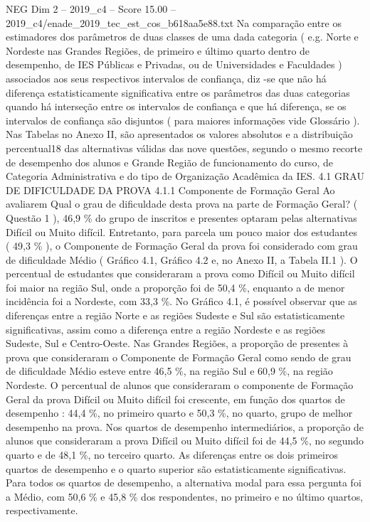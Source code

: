 \begin{textsample}{NEG Dim 2 – 2019\_c4 – Score 15.00 – 2019\_c4/enade\_2019\_tec\_est\_cos\_b618aa5e88.txt}
Na comparação entre os estimadores dos parâmetros de duas classes de uma dada categoria ( e.g.
Norte e Nordeste nas Grandes Regiões, de primeiro e último quarto dentro de desempenho, de IES Públicas e Privadas, ou de Universidades e Faculdades ) associados aos seus respectivos intervalos de confiança, diz -se que não há diferença estatisticamente significativa entre os parâmetros das duas categorias quando há interseção entre os intervalos de confiança e que há diferença, se os intervalos de confiança são disjuntos ( para maiores informações vide Glossário ).
Nas Tabelas no Anexo II, são apresentados os valores absolutos e a distribuição percentual18 das alternativas válidas das nove questões, segundo o mesmo recorte de desempenho dos alunos e Grande Região de funcionamento do curso, de Categoria Administrativa e do tipo de Organização Acadêmica da IES. 4.1 GRAU DE DIFICULDADE DA PROVA 4.1.1 Componente de Formação Geral Ao avaliarem Qual o grau de dificuldade desta prova na parte de Formação Geral? ( Questão 1 ), 46,9 \% do grupo de inscritos e presentes optaram pelas alternativas Difícil ou Muito difícil.
Entretanto, para parcela um pouco maior dos estudantes ( 49,3 \% ), o Componente de Formação Geral da prova foi considerado com grau de dificuldade Médio ( Gráfico 4.1, Gráfico 4.2 e, no Anexo II, a Tabela II.1 ).
O percentual de estudantes que consideraram a prova como Difícil ou Muito difícil foi maior na região Sul, onde a proporção foi de 50,4 \%, enquanto a de menor incidência foi a Nordeste, com 33,3 \%.
No Gráfico 4.1, é possível observar que as diferenças entre a região Norte e as regiões Sudeste e Sul são estatisticamente significativas, assim como a diferença entre a região Nordeste e as regiões Sudeste, Sul e Centro-Oeste.
Nas Grandes Regiões, a proporção de presentes à prova que consideraram o Componente de Formação Geral como sendo de grau de dificuldade Médio esteve entre 46,5 \%, na região Sul e 60,9 \%, na região Nordeste.
O percentual de alunos que consideraram o componente de Formação Geral da prova Difícil ou Muito difícil foi crescente, em função dos quartos de desempenho : 44,4 \%, no primeiro quarto e 50,3 \%, no quarto, grupo de melhor desempenho na prova.
Nos quartos de desempenho intermediários, a proporção de alunos que consideraram a prova Difícil ou Muito difícil foi de 44,5 \%, no segundo quarto e de 48,1 \%, no terceiro quarto.
As diferenças entre os dois primeiros quartos de desempenho e o quarto superior são estatisticamente significativas.
Para todos os quartos de desempenho, a alternativa modal para essa pergunta foi a Médio, com 50,6 \% e 45,8 \% dos respondentes, no primeiro e no último quartos, respectivamente.

\end{textsample}
